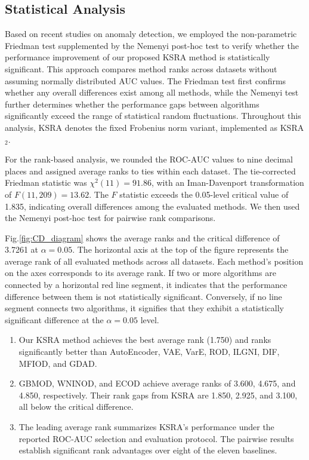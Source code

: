 \documentclass[ASNA,twocolumn]{USG} %
\begin{document}
\subsection{Statistical Analysis}

Based on recent studies \cite{cheng2025gbmod,su2025identifying,su2025granular} on anomaly detection, we employed the non-parametric Friedman test supplemented by the Nemenyi post-hoc test to verify whether the performance improvement of our proposed KSRA method is statistically significant. This approach compares method ranks across datasets without assuming normally distributed AUC values. The Friedman test first confirms whether any overall differences exist among all methods, while the Nemenyi test further determines whether the performance gaps between algorithms significantly exceed the range of statistical random fluctuations. Throughout this analysis, KSRA denotes the fixed Frobenius norm variant, implemented as KSRA$_2$.

For the rank-based analysis, we rounded the ROC-AUC values to nine decimal places and assigned average ranks to ties within each dataset. The tie-corrected Friedman statistic was $\chi^2(11) = 91.86$, with an Iman-Davenport transformation of $F(11, 209) = 13.62$. The $F$ statistic exceeds the 0.05-level critical value of 1.835, indicating overall differences among the evaluated methods. We then used the Nemenyi post-hoc test for pairwise rank comparisons.

Fig.\ref{fig:CD_diagram} shows the average ranks and the critical difference of 3.7261 at $\alpha = 0.05$. The horizontal axis at the top of the figure represents the average rank of all evaluated methods across all datasets. Each method's position on the axes corresponds to its average rank. If two or more algorithms are connected by a horizontal red line segment, it indicates that the performance difference between them is not statistically significant. Conversely, if no line segment connects two algorithms, it signifies that they exhibit a statistically significant difference at the $\alpha = 0.05$ level.

\begin{enumerate}[\indent (1)]
    \item Our KSRA method achieves the best average rank (1.750) and ranks significantly better than AutoEncoder, VAE, VarE, ROD, ILGNI, DIF, MFIOD, and GDAD.
    \item GBMOD, WNINOD, and ECOD achieve average ranks of 3.600, 4.675, and 4.850, respectively. Their rank gaps from KSRA are 1.850, 2.925, and 3.100, all below the critical difference.
    \item The leading average rank summarizes KSRA's performance under the reported ROC-AUC selection and evaluation protocol. The pairwise results establish significant rank advantages over eight of the eleven baselines.
\end{enumerate}
\end{document}
